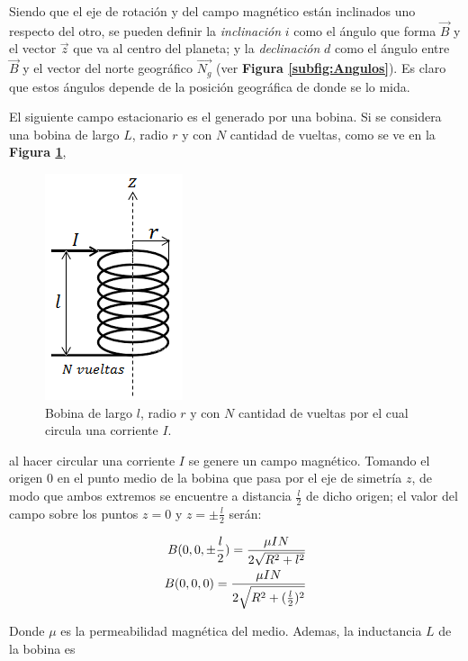 \documentclass[11pt,a4paper]{article}
\begin{document}
Siendo que el eje de rotación y del campo magnético están inclinados uno respecto del otro, se pueden definir la \textit{inclinación} $i$ como el ángulo que forma $\vec{B}$ y el vector $\vec{z}$ que va al centro del planeta; y la \textit{declinación} $d$ como el ángulo entre $\vec{B}$ y el vector del norte geográfico $\vec{N_g}$ (ver \textbf{ Figura \ref{subfig:Angulos}}). Es claro que estos ángulos depende de la posición geográfica de donde se lo mida.

\bigskip
El siguiente campo estacionario es el generado por una bobina. Si se considera una bobina de largo $L$, radio $r$ y con $N$ cantidad de vueltas, como se ve en la \textbf{Figura \ref{fig:bobina_intro}},

\begin{figure}[h]

\centering
\includegraphics[scale=1]{bobina.png}
	\caption{Bobina de largo $l$, radio $r$ y con $N$ cantidad de vueltas por el cual circula una corriente $I$.}
	\label{fig:bobina_intro}
\end{figure}

al hacer circular una corriente $I$ se genere un campo magnético. Tomando el origen $0$ en el punto medio de la bobina que pasa por el eje de simetría $z$, de modo que ambos extremos se encuentre a distancia $\frac{l}{2}$ de dicho origen; el valor del campo sobre los puntos $z=0$ y $z=\pm \frac{l}{2}$ serán:

\begin{equation}{\label{valores_B}}
\begin{split}
B(0,0, \pm \frac{l}{2})= \frac{\mu I N}{2\sqrt{R^2+l^2}}\\
B(0,0,0)= \frac{\mu I N}{2\sqrt{R^2+(\frac{l}{2})^2}}
\end{split}
\end{equation}

Donde $\mu$ es la permeabilidad magnética del medio. Ademas, la inductancia $L$ de la bobina es
\end{document}
